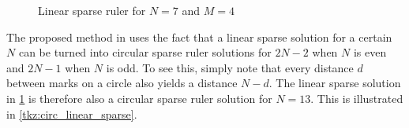 \documentclass[a4paper, openany, oneside]{memoir}
\begin{document}
\begin{figure}[H]
\centering
{}
\caption{Linear sparse ruler for $N=7$ and $M=4$}\label{tkz:linear_sparse_ruler}
\end{figure}

The proposed method in \cite{ariananda2012compressive} uses the fact that a linear sparse solution for a certain $N$ can be turned into circular sparse ruler solutions for $2N-2$ when $N$ is even and $2N-1$ when $N$ is odd. To see this, simply note that every distance $d$ between marks on a circle also yields a distance $N-d$. The linear sparse solution in \cref{tkz:linear_sparse_ruler} is therefore also a circular sparse ruler solution for $N=13$. This is illustrated in \cref{tkz:circ_linear_sparse}. 
\end{document}
